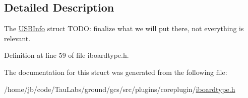 \subsection{\-Detailed \-Description}
\-The \hyperlink{struct_core_1_1_i_board_type_1_1_u_s_b_info}{\-U\-S\-B\-Info} struct \-T\-O\-D\-O\-: finalize what we will put there, not everything is relevant. 

\-Definition at line 59 of file iboardtype.\-h.



\-The documentation for this struct was generated from the following file\-:\begin{DoxyCompactItemize}
\item 
/home/jb/code/\-Tau\-Labs/ground/gcs/src/plugins/coreplugin/\hyperlink{iboardtype_8h}{iboardtype.\-h}\end{DoxyCompactItemize}
